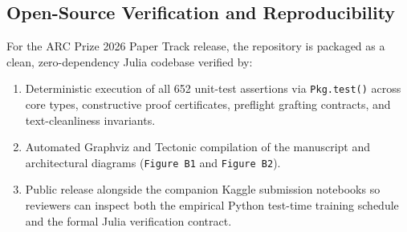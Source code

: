 \subsection{Open-Source Verification and Reproducibility}
For the ARC Prize 2026 Paper Track release, the repository is packaged as a clean, zero-dependency Julia codebase verified by:
\begin{enumerate}
  \item Deterministic execution of all 652 unit-test assertions via \texttt{Pkg.test()} across core types, constructive proof certificates, preflight grafting contracts, and text-cleanliness invariants.
  \item Automated Graphviz and Tectonic compilation of the manuscript and architectural diagrams (\texttt{Figure B1} and \texttt{Figure B2}).
  \item Public release alongside the companion Kaggle submission notebooks so reviewers can inspect both the empirical Python test-time training schedule and the formal Julia verification contract.
\end{enumerate}

